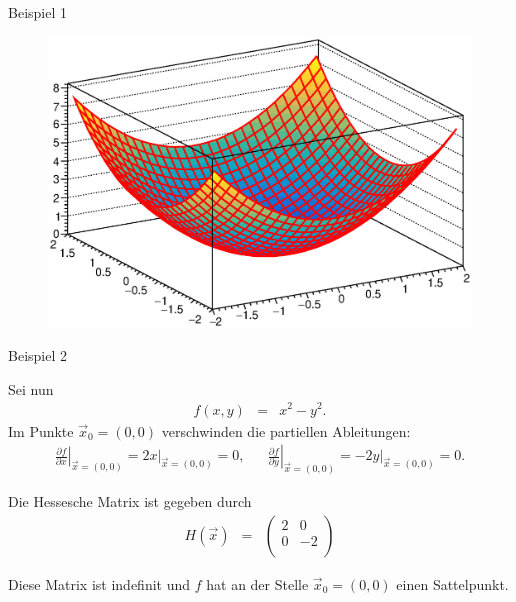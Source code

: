 \documentclass[german]{beamer}
\newcommand{\bq}{\begin{eqnarray*}}
\newcommand{\eq}{\end{eqnarray*}}
\begin{document}
\begin{frame}{Beispiel 1}

\begin{figure}
\includegraphics[scale=0.5]{minimum}
\end{figure}

\end{frame}

\begin{frame}{Beispiel 2}

\begin{example}
Sei nun
\bq
 f(x,y) & = & x^2 - y^2.
\eq
Im Punkte $\vec{x}_0=(0,0)$ verschwinden die partiellen Ableitungen:
{\footnotesize
\bq
 \left.\frac{\partial f}{\partial x}\right|_{\vec{x}=(0,0)}
 = \left. 2 x \right|_{\vec{x}=(0,0)}
 = 0,
 & &
 \left.\frac{\partial f}{\partial y}\right|_{\vec{x}=(0,0)}
 = \left. -2 y \right|_{\vec{x}=(0,0)}
 = 0.
\eq
}

\vspace*{-2mm}
Die Hessesche Matrix ist gegeben durch
{\footnotesize
\bq
 H(\vec{x}) & = & \left( \begin{array}{cc}
  2 & 0 \\
  0 & -2 \\
 \end{array} \right)
\eq
}

\vspace*{-2mm}
Diese Matrix ist indefinit und $f$ hat an der Stelle $\vec{x}_0=(0,0)$ einen Sattelpunkt.
\end{example}

\end{frame}
\end{document}
